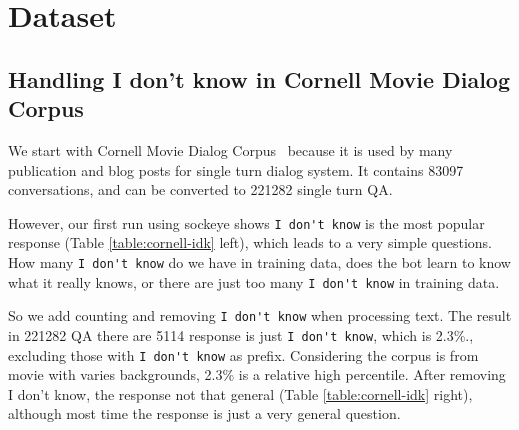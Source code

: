 \documentclass{article}
\begin{document}
\section{Dataset}
\label{sec:dataset}

\subsection{Handling I don't know in Cornell Movie Dialog Corpus}
\label{subsec:idk}

We start with Cornell Movie Dialog Corpus~\cite{data:cornell} because it is used by many publication and blog posts for single turn dialog system.
It contains 83097 conversations, and can be converted to 221282 single turn QA.

However, our first run using sockeye shows \verb+I don't know+ is the most popular response (Table \ref{table:cornell-idk} left),
which leads to a very simple questions. How many \verb+I don't know+ do we have in training data,
does the bot learn to know what it really knows, or there are just too many \verb+I don't know+ in training data.

So we add counting and removing \verb+I don't know+ when processing text.
The result in 221282 QA there are 5114 response is just \verb+I don't know+, which is 2.3\%., excluding those with \verb+I don't know+ as prefix.
Considering the corpus is from movie with varies backgrounds, 2.3\% is a relative high percentile.
After removing I don't know, the response not that general (Table \ref{table:cornell-idk} right), although most time the
response is just a very general question.
\end{document}
